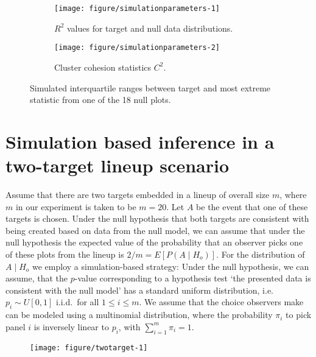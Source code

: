 \documentclass[12pt]{article}\usepackage[]{graphicx}\usepackage[]{color}
\newenvironment{knitrout}{}{} %
\begin{document}
\begin{appendix}
\begin{figure}[bht]\centering
\begin{subfigure}[t]{.8\linewidth}
\caption{$R^2$ values for target and null data distributions. \label{fig:simulationLineIntervals}}
\vspace{-.15in}
\texttt{[image: figure/simulationparameters-1]}
\end{subfigure}
\begin{subfigure}[t]{.8\linewidth}
\caption{Cluster cohesion statistics $C^2$. \label{fig:simulationClusterIntervals}}
\vspace{-.15in}
\texttt{[image: figure/simulationparameters-2]}
\end{subfigure}
\caption{Simulated interquartile ranges between target and most extreme statistic from one of the 18 null plots. }
\end{figure}
\clearpage

\section{Simulation based inference in a two-target lineup scenario}\label{sec:simulation}

Assume that there are two targets embedded in a lineup of overall size $m$, where $m$ in our experiment is taken to be $m=20$. Let $A$ be the event that one of these targets is chosen.
Under the null hypothesis that both targets are consistent with being created based on data from the null model, we can assume that under the null hypothesis the expected value of the probability that an observer picks one of these plots from the lineup is $2/m = E[ P(A \mid H_o) ]$.
For the distribution of $A \mid H_o$ we employ a simulation-based strategy:
Under the null hypothesis, we can assume, that the $p$-value corresponding to a hypothesis test `the presented data is consistent with the null model' has a standard uniform distribution, i.e. $p_i \sim U[0,1]$ i.i.d.~for all $1 \le i \le m$. We assume that the choice observers make can be modeled using a multinomial distribution, where the probability $\pi_i$ to pick panel $i$ is inversely linear to $p_i$, with $\sum_{i=1}^m \pi_i = 1$.

\begin{figure}[h!tbp]

\begin{knitrout}
\color{fgcolor}

{\centering \texttt{[image: figure/twotarget-1]} 

}
\end{knitrout}
\end{figure}
\end{appendix}
\end{document}
